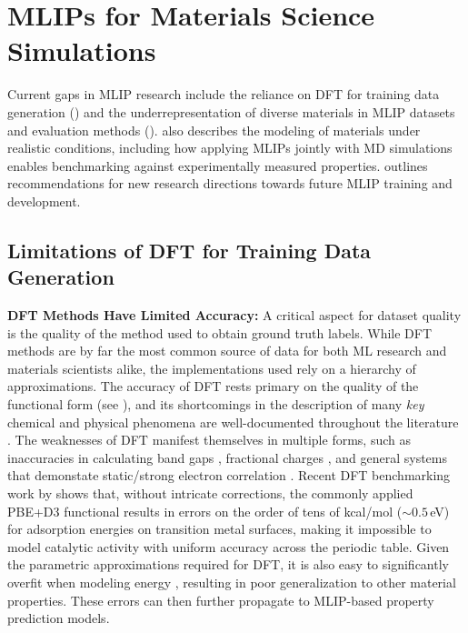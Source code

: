 \section{MLIPs for Materials Science Simulations} \label{sec:materials}



Current gaps in MLIP research include the reliance on DFT for training data generation () and the underrepresentation of diverse materials in MLIP datasets and evaluation methods ().
 also describes the modeling of materials under realistic conditions, including how applying MLIPs jointly with MD simulations enables benchmarking against experimentally measured properties.  outlines recommendations for new research directions towards future MLIP training and development. 

\subsection{Limitations of DFT for Training Data Generation} \label{sec:dft-limits}
\textbf{DFT Methods Have Limited Accuracy:} A critical aspect for dataset quality is the quality of the method used to obtain ground truth labels. While DFT methods are by far the most common source of data for both ML research and materials scientists alike, the implementations used rely on a hierarchy of approximations. The accuracy of DFT rests primary on the quality of the functional form (see ), and its shortcomings in the description of many \emph{key} chemical and physical phenomena are well-documented throughout the literature \citep{schuch2009computational}. The weaknesses of DFT manifest themselves in multiple forms, such as inaccuracies in calculating band gaps \citep{perdewDensityFunctionalTheory1985,bystromAddressingBandGap2024a}, fractional charges \citep{cohenChallengesDensityFunctional2012}, and general systems that demonstate static/strong electron correlation \citep{cohenFractionalSpinsStatic2008,suDescribingStrongCorrelation2018}. Recent DFT benchmarking work by \citet{araujoAdsorptionEnergiesTransition2022} shows that, without intricate corrections, the commonly applied PBE+D3 functional results in errors on the order of tens of kcal/mol (${\sim}0.5$\,eV) for adsorption energies on transition metal surfaces, making it impossible to model catalytic activity with uniform accuracy across the periodic table. Given the parametric approximations required for DFT, it is also easy to significantly overfit when modeling energy \citep{medvedevDensityFunctionalTheory2017}, resulting in poor generalization to other material properties. These errors can then further propagate to MLIP-based property prediction models.


